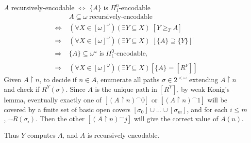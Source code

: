 \begin{frame}{$A$ recursively-encodable $\Leftrightarrow$
$\{A\}$ is $\Pi_1^0$-encodable}
  \begin{align*}
    \;&A\subseteq\omega\; \text{recursively-encodable}\\
    \Leftrightarrow\; & (\forall X\in[\omega]^\omega)(\exists Y\subseteq
      X)\; [Y\geq_T A]\\
    \Rightarrow\; & (\forall X\in[\omega]^\omega)(\exists Y\subseteq X)\;
      [\{A\}\supseteq \{Y\}]\\
    \Rightarrow\; &\{A\}\subseteq\omega^\omega\; \text{is}\;
      \Pi_1^0\text{-encodable},\\
    &\\
    \Rightarrow\; & (\forall X\in[\omega]^\omega)(\exists Y\subseteq
      X) [\{A\}=[R^Y]]
  \end{align*}
  Given $A\restriction n$, to decide if $n\in A$, enumerate all paths
  $\sigma\in2^{<\omega}$ extending $A\restriction n$ and check if
  $R^Y(\sigma)$. Since $A$ is the unique path in $[R^Y]$, by weak Konig's
  lemma, eventually exactly one of $[(A\restriction n)^\frown 0]$ or
  $[(A\restriction n)^\frown 1]$ will be covered by a finite set of basic
  open covers $[\sigma_0]\cup\ldots\cup[\sigma_m]$, and for each $i\leq m$,
  $\neg R(\sigma_i)$. Then the other $[(A\restriction n)^\frown j]$ will
  give the correct value of $A(n)$.
  \vspace{0.5em}

  Thus $Y$ computes $A$, and $A$ is recursively encodable.
\end{frame}
